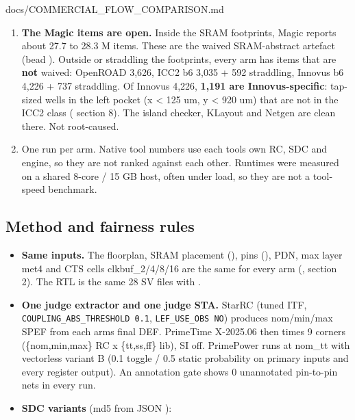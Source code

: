 \begin{relocated}{docs/COMMERCIAL_FLOW_COMPARISON.md}
\begin{enumerate}
  \textbf{IR is indicative.} The RedHawk tech is authored and
  uncorrelated. Cell currents are RedHawk defaults (no APL). Decap
  capacitance is estimated from spice W/L. The supply is an ideal edge
  feed (met5 stripe ends, no package). Power is PrimePower vectorless at
  0.1 / 0.5.
\item
  \textbf{The Magic  items are open.} Inside the SRAM
  footprints, Magic reports about 27.7 to 28.3 M items. These are the
  waived SRAM-abstract artefact (bead ). Outside or straddling
  the footprints, every arm has  items that are
  \textbf{not} waived: OpenROAD 3,626, ICC2 b6 3,035 + 592 straddling,
  Innovus b6 4,226 + 737 straddling. Of Innovus\textquotesingle{} 4,226,
  \textbf{1,191 are Innovus-specific}: tap-sized wells in the left
  pocket (x \textless{} 125 um, y \textless{} 920 um) that are not in
  the ICC2 class ( section 8). The
  island checker, KLayout and Netgen are clean there. Not root-caused.
\item
  One run per arm. Native tool numbers use each tool\textquotesingle s
  own RC, SDC and engine, so they are not ranked against each other.
  Runtimes were measured on a shared 8-core / 15 GB host, often under
  load, so they are not a tool-speed benchmark.
\end{enumerate}

\subsection{Method and fairness rules}\label{tm:pd:commercial-flow-comparison:3-method-and-fairness-rules}

\begin{itemize}
\item
  \textbf{Same inputs.} The floorplan, SRAM placement
  (), pins
  (), PDN, max layer met4 and CTS cells
  clkbuf\_\allowbreak{}2/\allowbreak{}4/\allowbreak{}8/\allowbreak{}16
  are the same for every arm (,
   section 2). The RTL is the same 28
  SV files with .
\item
  \textbf{One judge extractor and one judge STA.} StarRC (tuned ITF,
  \texttt{COUPLING\_\allowbreak{}ABS\_\allowbreak{}THRESHOLD\ 0.\allowbreak{}1},
  \texttt{LEF\_\allowbreak{}USE\_\allowbreak{}OBS\ NO}) produces
  nom/\allowbreak{}min/\allowbreak{}max SPEF from each
  arm\textquotesingle s final DEF. PrimeTime X-2025.06 then times 9
  corners (\{nom,min,max\} RC x \{tt,ss,ff\} lib), SI off. PrimePower
  runs at nom\_tt with vectorless variant B (0.1 toggle / 0.5 static
  probability on primary inputs and every register output). An
  annotation gate shows 0 unannotated pin-to-pin nets in every run.
\item
  \textbf{SDC variants} (md5 from JSON ):


\end{itemize}
\end{relocated}
